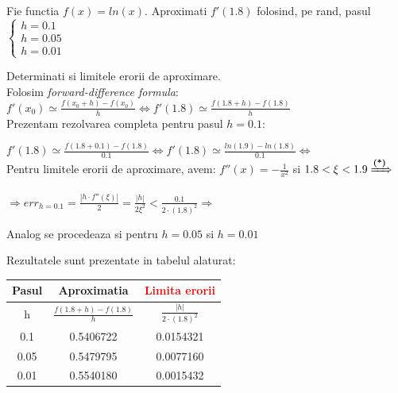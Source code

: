\documentclass{article}
\begin{document}
\tabto{0.5cm} Fie functia $f(x) = ln(x)$. Aproximati $f'(1.8)$ folosind, pe rand, pasul 
$\begin{cases}
    h = 0.1 \\
    h = 0.05 \\
    h = 0.01
\end{cases}$\vspace{-0.5cm}

Determinati si limitele erorii de aproximare.\\

Folosim \textit{forward-difference formula}: $f'(x_0) \simeq \frac{f(x_0+h)-f(x_0)}{h} \iff f'(1.8) \simeq \frac{f(1.8+h)-f(1.8)}{h}$\\

Prezentam rezolvarea completa pentru pasul $h=0.1$:\vspace{0.1cm}

$f'(1.8) \simeq \frac{f(1.8+0.1)-f(1.8)}{0.1} \iff f'(1.8) \simeq \frac{ln(1.9)-ln(1.8)}{0.1} \iff$ \\

Pentru limitele erorii de aproximare, avem: $f''(x) = -\frac{1}{x^2}$ si $1.8 < \xi < 1.9 \xRightarrow[]{\textbf{(*)}}$

$\Rightarrow err_{h=0.1} = \frac{|h \cdot f''(\xi)|}{2} = \frac{|h|}{2 \xi^2} < \frac{0.1}{2 \cdot (1.8)^2} \Rightarrow$
\\

\begin{minipage}{0.55\textwidth}
Analog se procedeaza si pentru $h=0.05$ si $h=0.01$

Rezultatele sunt prezentate in tabelul alaturat:
\end{minipage}
\begin{minipage}{0.45\textwidth}
    \begin{tabular}{c | c | c}
        Pasul & Aproximatia & \textcolor{red}{Limita erorii} \\
        \hline
        \rule{0pt}{1\normalbaselineskip}h & $\frac{f(1.8+h)-f(1.8)}{h}$ & $\frac{|h|}{2\cdot (1.8)^2}$ \\
        \hline
        0.1  & 0.5406722 & 0.0154321 \\
        \hline
        0.05 & 0.5479795 & 0.0077160 \\
        \hline
        0.01 & 0.5540180 & 0.0015432 \\
    \end{tabular}
\end{minipage}\\
\end{document}
